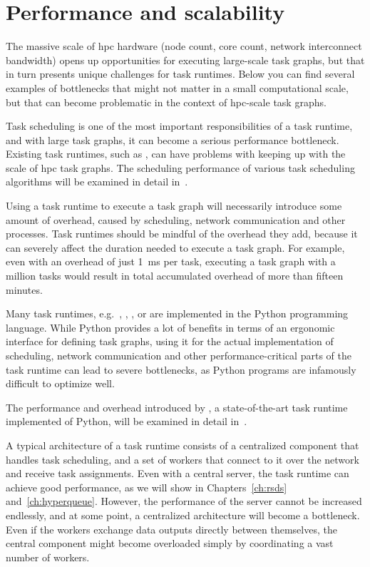 \section{Performance and scalability}
The massive scale of \gls{hpc} hardware (node count, core count, network interconnect
bandwidth) opens up opportunities for executing large-scale task graphs, but that in turn presents
unique challenges for task runtimes. Below you can find several examples of bottlenecks that might
not matter in a small computational scale, but that can become problematic in the context of
\gls{hpc}-scale task graphs.

\begin{description}[wide=0pt]
	\item[Scheduling] Task scheduling is one of the most important responsibilities of a task runtime, and with large
	task graphs, it can become a serious performance bottleneck. Existing task runtimes, such as
	\dask{}, can have problems with keeping up with the scale of \gls{hpc}
	task graphs. The scheduling performance of various task scheduling algorithms will be examined in
	detail in~.
	\item[Runtime overhead] Using a task runtime to execute a task graph will necessarily introduce some amount of overhead,
	caused by scheduling, network communication and other processes. Task runtimes should be mindful of
	the overhead they add, because it can severely affect the duration needed to execute a task graph.
	For example, even with an overhead of just \SI{1}{\milli\second} per task, executing a task graph
	with a million tasks would result in total accumulated overhead of more than fifteen minutes.

	Many task runtimes, e.g.\ \dask{}, \parsl{}, \balsam{},
	\autosubmit{} or \snakemake{} are implemented in the Python programming
	language. While Python provides a lot of benefits in terms of an ergonomic interface for defining
	task graphs, using it for the actual implementation of scheduling, network communication and other
	performance-critical parts of the task runtime can lead to severe bottlenecks, as Python programs
	are infamously difficult to optimize well.

	The performance and overhead introduced by \dask{}, a state-of-the-art task runtime
	implemented of Python, will be examined in detail in~.

	\item[Architecture] A typical architecture of a task runtime consists of a centralized component that handles task
	scheduling, and a set of workers that connect to it over the network and receive task assignments.
	Even with a central server, the task runtime can achieve good performance, as we will show in
	Chapters~\ref{ch:rsds} and~\ref{ch:hyperqueue}. However, the performance of the server
	cannot be increased endlessly, and at some point, a centralized architecture will become a
	bottleneck. Even if the workers exchange data outputs directly between themselves, the central
	component might become overloaded simply by coordinating a vast number of workers.


\end{description}
